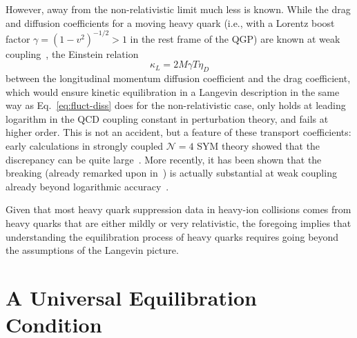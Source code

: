 \documentclass[final,3p,times]{elsarticle}
\begin{document}
However, away from the non-relativistic limit much less is known. While the drag and diffusion coefficients for a moving heavy quark (i.e., with a Lorentz boost factor $\gamma = (1-v^2)^{-1/2} > 1$ in the rest frame of the QGP) are known at weak coupling~\cite{Moore:2004tg}, the Einstein relation
\begin{equation}
    \kappa_L = 2 M \gamma T \eta_D \label{eq:einstein}
\end{equation}
between the longitudinal momentum diffusion coefficient and the drag coefficient, which would ensure kinetic equilibration in a Langevin description in the same way as Eq.~\eqref{eq:fluct-diss} does for the non-relativistic case, only holds at leading logarithm in the QCD coupling constant in perturbation theory, and fails at higher order. This is not an accident, but a feature of these transport coefficients: early calculations in strongly coupled $\mathcal{N}=4$ SYM theory showed that the discrepancy can be quite large~\cite{AdSCFT}. %
More recently, it has been shown that the breaking (already remarked upon in~\cite{Moore:2004tg}) is actually substantial at weak coupling already beyond logarithmic accuracy~\cite{DuPlessis:2026pyr}. 

Given that most heavy quark suppression data in heavy-ion collisions comes from heavy quarks that are either mildly or very relativistic, the foregoing implies that understanding the equilibration process of heavy quarks requires going beyond the assumptions of the Langevin picture.


\section{A Universal Equilibration Condition}
\end{document}
